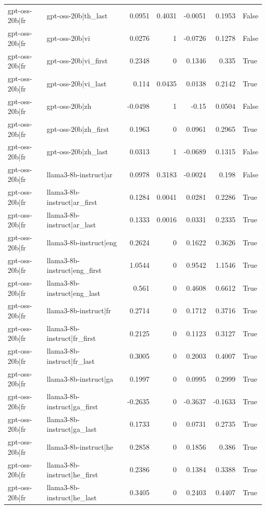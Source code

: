 \begin{table}
\begin{tabular}{l l r r r r l}
gpt-oss-20b|fr & gpt-oss-20b|th_last & 0.0951 & 0.4031 & -0.0051 & 0.1953 & False \\
gpt-oss-20b|fr & gpt-oss-20b|vi & 0.0276 & 1 & -0.0726 & 0.1278 & False \\
gpt-oss-20b|fr & gpt-oss-20b|vi_first & 0.2348 & 0 & 0.1346 & 0.335 & True \\
gpt-oss-20b|fr & gpt-oss-20b|vi_last & 0.114 & 0.0435 & 0.0138 & 0.2142 & True \\
gpt-oss-20b|fr & gpt-oss-20b|zh & -0.0498 & 1 & -0.15 & 0.0504 & False \\
gpt-oss-20b|fr & gpt-oss-20b|zh_first & 0.1963 & 0 & 0.0961 & 0.2965 & True \\
gpt-oss-20b|fr & gpt-oss-20b|zh_last & 0.0313 & 1 & -0.0689 & 0.1315 & False \\
gpt-oss-20b|fr & llama3-8b-instruct|ar & 0.0978 & 0.3183 & -0.0024 & 0.198 & False \\
gpt-oss-20b|fr & llama3-8b-instruct|ar_first & 0.1284 & 0.0041 & 0.0281 & 0.2286 & True \\
gpt-oss-20b|fr & llama3-8b-instruct|ar_last & 0.1333 & 0.0016 & 0.0331 & 0.2335 & True \\
gpt-oss-20b|fr & llama3-8b-instruct|eng & 0.2624 & 0 & 0.1622 & 0.3626 & True \\
gpt-oss-20b|fr & llama3-8b-instruct|eng_first & 1.0544 & 0 & 0.9542 & 1.1546 & True \\
gpt-oss-20b|fr & llama3-8b-instruct|eng_last & 0.561 & 0 & 0.4608 & 0.6612 & True \\
gpt-oss-20b|fr & llama3-8b-instruct|fr & 0.2714 & 0 & 0.1712 & 0.3716 & True \\
gpt-oss-20b|fr & llama3-8b-instruct|fr_first & 0.2125 & 0 & 0.1123 & 0.3127 & True \\
gpt-oss-20b|fr & llama3-8b-instruct|fr_last & 0.3005 & 0 & 0.2003 & 0.4007 & True \\
gpt-oss-20b|fr & llama3-8b-instruct|ga & 0.1997 & 0 & 0.0995 & 0.2999 & True \\
gpt-oss-20b|fr & llama3-8b-instruct|ga_first & -0.2635 & 0 & -0.3637 & -0.1633 & True \\
gpt-oss-20b|fr & llama3-8b-instruct|ga_last & 0.1733 & 0 & 0.0731 & 0.2735 & True \\
gpt-oss-20b|fr & llama3-8b-instruct|he & 0.2858 & 0 & 0.1856 & 0.386 & True \\
gpt-oss-20b|fr & llama3-8b-instruct|he_first & 0.2386 & 0 & 0.1384 & 0.3388 & True \\
gpt-oss-20b|fr & llama3-8b-instruct|he_last & 0.3405 & 0 & 0.2403 & 0.4407 & True \\

\end{tabular}
\end{table}
